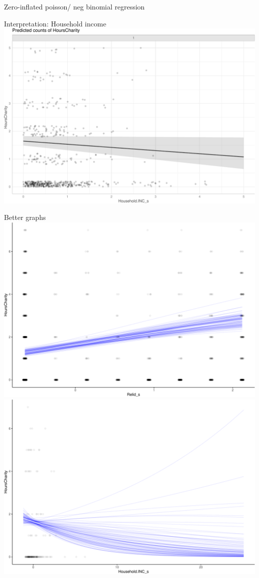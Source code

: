\documentclass[
  ignorenonframetext,
]{beamer}
\begin{document}
\begin{frame}[fragile]{Zero-inflated poisson/ neg binomial regression}
\begin{block}{Interpretation: Household income}
\protect\hypertarget{interpretation-household-income}{}
\includegraphics{slides_files/figure-beamer/unnamed-chunk-64-1.pdf}
\end{block}

\begin{block}{Better graphs}
\protect\hypertarget{better-graphs}{}
\includegraphics{slides_files/figure-beamer/unnamed-chunk-65-1.pdf}
\includegraphics{slides_files/figure-beamer/unnamed-chunk-65-2.pdf}


\end{block}
\end{frame}
\end{document}
